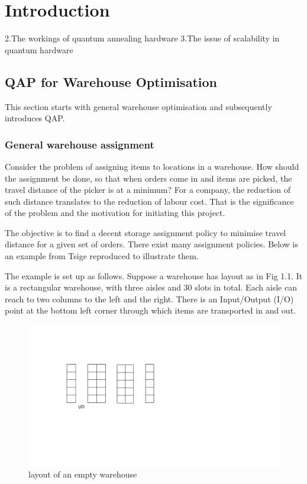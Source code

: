 \documentclass[hyp]{socreport}
\begin{document}
\listoffigures 
\listoftables
\tableofcontents 

\chapter{Introduction}
\label{ch:intro}
2.The workings of quantum annealing hardware
3.The issue of scalability in quantum hardware

\section{QAP for Warehouse Optimisation}
This section starts with general warehouse optimisation and subsequently introduces QAP.

\subsection{General warehouse assignment}

Consider the problem of assigning items to locations in a warehouse. How should the assignment be done, so that when orders come in and items are picked, the travel distance of the picker is at a minimum? For a company, the reduction of such distance translates to the reduction of labour cost. That is the significance of the problem and the motivation for initiating this project.

\label{sec:example}
The objective is to find a decent storage assignment policy to minimise travel distance for a given set of orders. There exist many assignment policies. Below is an example from Tsige \cite{Tsige:2013} reproduced to illustrate them. 

The example is set up as follows. Suppose a warehouse has layout as in Fig 1.1. It is a rectangular warehouse, with three aisles and 30 slots in total. Each aisle can reach to two columns to the left and the right. There is an Input/Output (I/O) point at the bottom left corner through which items are transported in and out.
\begin{figure}
\includegraphics[scale=0.8]{empty}
\centering
\caption{layout of an empty warehouse}
\end{figure}
\end{document}
